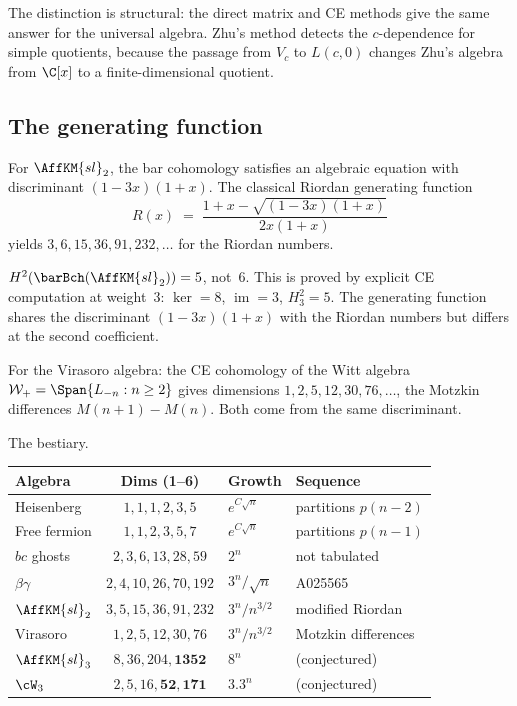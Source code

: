 The distinction is structural: the direct matrix and CE methods
give the same answer for the universal algebra. Zhu's method
detects the $c$-dependence for simple quotients, because the
passage from $V_c$ to $L(c,0)$ changes Zhu's algebra from
$\C[x]$ to a finite-dimensional quotient.


\subsection{The generating function}
\label{subsec:comp-bar-gf}

For $\AffKM{sl}_2$, the bar cohomology satisfies an algebraic
equation with discriminant $(1-3x)(1+x)$. The classical
Riordan generating function
\[
R(x) \;=\; \frac{1 + x - \sqrt{(1-3x)(1+x)}}{2x(1+x)}
\]
yields $3, 6, 15, 36, 91, 232, \ldots$ for the Riordan
numbers.

\begin{remark}\label{rem:riordan-h2}
$H^2(\barBch(\AffKM{sl}_2)) = 5$, not~$6$. This is proved
by explicit CE computation at weight~$3$:
$\ker = 8$, $\operatorname{im} = 3$, $H^2_3 = 5$. The
generating function shares the discriminant $(1-3x)(1+x)$ with
the Riordan numbers but differs at the second coefficient.
\end{remark}

For the Virasoro algebra: the CE cohomology of the Witt
algebra $\mathcal{W}_+ = \Span\{L_{-n} : n \geq 2\}$ gives
dimensions $1, 2, 5, 12, 30, 76, \ldots$, the Motzkin
differences $M(n+1) - M(n)$. Both come from the same
discriminant.

The bestiary.

\begin{center}
\small
\renewcommand{\arraystretch}{1.15}
\begin{tabular}{lcll}
\textbf{Algebra} & \textbf{Dims (1--6)}
 & \textbf{Growth} & \textbf{Sequence}\\
\hline
Heisenberg & $1,1,1,2,3,5$ & $e^{C\sqrt{n}}$
 & partitions $p(n{-}2)$ \\
Free fermion & $1,1,2,3,5,7$ & $e^{C\sqrt{n}}$
 & partitions $p(n{-}1)$ \\
$bc$ ghosts & $2,3,6,13,28,59$ & $2^n$
 & not tabulated \\
$\beta\gamma$ & $2,4,10,26,70,192$ & $3^n/\sqrt{n}$
 & A025565 \\
$\AffKM{sl}_2$ & $3,5,15,36,91,232$ & $3^n/n^{3/2}$
 & modified Riordan \\
Virasoro & $1,2,5,12,30,76$ & $3^n/n^{3/2}$
 & Motzkin differences \\
$\AffKM{sl}_3$ & $8,36,204,\mathbf{1352}$
 & $8^n$ & (conjectured) \\
$\cW_3$ & $2,5,16,\mathbf{52},\mathbf{171}$
 & $3.3^n$ & (conjectured)
\end{tabular}
\end{center}


